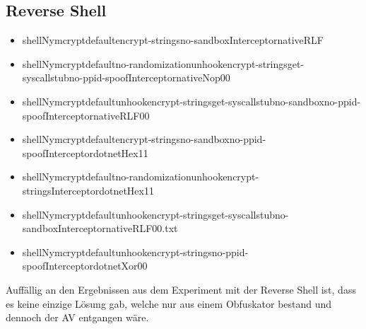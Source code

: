 \subsection{Reverse Shell}
\begin{itemize}
\item shellNymcryptdefaultencrypt-stringsno-sandboxInterceptornativeRLF
\item shellNymcryptdefaultno-randomizationunhookencrypt-stringsget-syscallstubno-ppid-spoofInterceptornativeNop00
\item shellNymcryptdefaultunhookencrypt-stringsget-syscallstubno-sandboxno-ppid-spoofInterceptornativeRLF00
\item shellNymcryptdefaultencrypt-stringsno-sandboxno-ppid-spoofInterceptordotnetHex11
\item shellNymcryptdefaultno-randomizationunhookencrypt-stringsInterceptordotnetHex11
\item shellNymcryptdefault\-unhook\-encrypt-stringsget\--syscallstubno-sandbox\-InterceptornativeRLF00.txt
\item shellNymcryptdefaultunhookencrypt-stringsno-ppid-spoofInterceptordotnetXor00
\end{itemize}
Auffällig an den Ergebnissen aus dem Experiment mit der Reverse Shell ist, dass es keine einzige Lösung gab, welche nur aus einem Obfuskator bestand und dennoch der AV entgangen wäre.